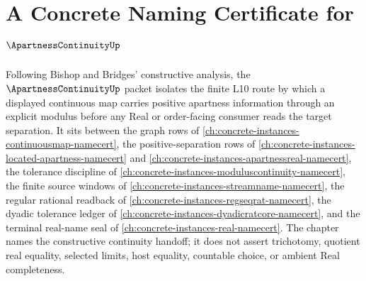 \chapter{A Concrete Naming Certificate for $\ApartnessContinuityUp$}
\label{ch:concrete-instances-apartness-continuity-namecert}

Following Bishop and Bridges' constructive analysis, the $\ApartnessContinuityUp$ packet isolates the finite L10 route by which a displayed continuous map carries positive apartness information through an explicit modulus before any Real or order-facing consumer reads the target separation. It sits between the graph rows of \autoref{ch:concrete-instances-continuousmap-namecert}, the positive-separation rows of \autoref{ch:concrete-instances-located-apartness-namecert} and \autoref{ch:concrete-instances-apartnessreal-namecert}, the tolerance discipline of \autoref{ch:concrete-instances-moduluscontinuity-namecert}, the finite source windows of \autoref{ch:concrete-instances-streamname-namecert}, the regular rational readback of \autoref{ch:concrete-instances-regseqrat-namecert}, the dyadic tolerance ledger of \autoref{ch:concrete-instances-dyadicratcore-namecert}, and the terminal real-name seal of \autoref{ch:concrete-instances-real-namecert}. The chapter names the constructive continuity handoff; it does not assert trichotomy, quotient real equality, selected limits, host equality, countable choice, or ambient Real completeness.

